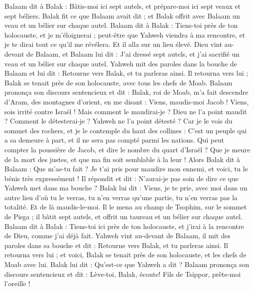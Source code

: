 \begin{multicols}{2}
\VerseOne{}Balaam dit à Balak : Bâtis-moi ici sept autels, et prépare-moi ici sept veaux et sept béliers.
Balak fit ce que Balaam avait dit ; et Balak offrit avec Balaam un veau et un bélier sur chaque autel.
Balaam dit à Balak : Tiens-toi près de ton holocauste, et je m’éloignerai ; peut-être que Yahweh viendra à ma rencontre, et je te dirai tout ce qu'il me révélera. Et il alla sur un lieu élevé.
Dieu vint au-devant de Balaam, et Balaam lui dit : J'ai dressé sept autels, et j'ai sacrifié un veau et un bélier sur chaque autel.
Yahweh mit des paroles dans la bouche de Balaam et lui dit : Retourne vers Balak, et tu parleras ainsi.
Il retourna vers lui ; Balak se tenait près de son holocauste, avec tous les chefs de Moab.
Balaam prononça son discours sentencieux et dit : Balak, roi de Moab, m'a fait descendre d'Aram, des montagnes d'orient, en me disant : Viens, maudis-moi Jacob ! Viens, sois irrité contre Israël !
Mais comment le maudirai-je ? Dieu ne l’a point maudit ?  Comment le détesterai-je ? Yahweh ne l’a point détesté ?
Car je le vois du sommet des rochers, et je le contemple du haut des collines : C’est un peuple qui a sa demeure à part, et il ne sera pas compté parmi les nations.
Qui peut compter la poussière de Jacob, et dire le nombre du quart d'Israël ? Que je meure de la mort des justes, et que ma fin soit semblable à la leur !
Alors Balak dit à Balaam : Que m'as-tu fait ? Je t'ai pris pour maudire mon ennemi, et voici, tu le bénis très expressément !
Il répondit et dit : N’aurai-je pas soin de dire ce que Yahweh met dans ma bouche ?
Balak lui dit : Viens, je te prie, avec moi dans un autre lieu d'où tu le verras, tu n’en verras qu’une partie, tu n’en verras pas la totalité. Et de là maudis-le-moi.
Il le mena au champ de Tsophim, sur le sommet de Pisga ; il bâtit sept autels, et offrit un taureau et un bélier sur chaque autel.
Balaam dit à Balak : Tiens-toi ici près de ton holocauste, et j’irai à la rencontre de Dieu, comme j'ai déjà fait.
Yahweh vint au-devant de Balaam, il mit des paroles dans sa bouche et dit : Retourne vers Balak, et tu parleras ainsi.
Il retourna vers lui ; et voici, Balak se tenait près de son holocauste, et les chefs de Moab avec lui. Balak lui dit : Qu'est-ce que Yahweh a dit ?
Balaam prononça son discours sentencieux et dit : Lève-toi, Balak, écoute! Fils de Tsippor, prête-moi l'oreille !

\end{multicols}
